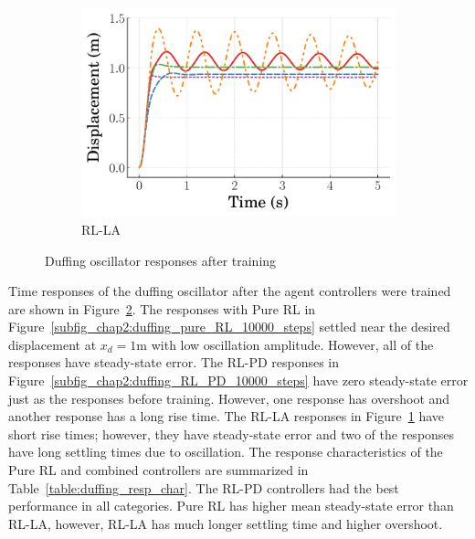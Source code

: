 \begin{figure}[tb]
    \hfill
    \begin{subfigure}[b]{0.49\textwidth}
        \centering
        \includegraphics[width=\textwidth]{figures/figures_RL_model_based_control/time_responses_duffing/duffing_RL_LA/Displacement_1_init_10000_steps.pdf}
        \caption{RL-LA}
        \label{subfig_chap2:duffing_RL_LA_10000_steps}
    \end{subfigure}
    \hfill
    \caption{Duffing oscillator responses after training}
    \label{fig_chap2:duffing_10000_steps}
\end{figure}
%
Time responses of the duffing oscillator after the agent controllers were trained are shown in Figure~\ref{fig_chap2:duffing_10000_steps}. The responses with Pure RL in Figure~\ref{subfig_chap2:duffing_pure_RL_10000_steps} settled near the desired displacement at $x_d=1\si{\meter}$ with low oscillation amplitude. However, all of the responses have steady-state error. The RL-PD responses in Figure~\ref{subfig_chap2:duffing_RL_PD_10000_steps} have zero steady-state error just as the responses before training. However, one response has overshoot and another response has a long rise time. The RL-LA responses in Figure~\ref{subfig_chap2:duffing_RL_LA_10000_steps} have short rise times; however, they have steady-state error and two of the responses have long settling times due to oscillation. The response characteristics of the Pure RL and combined controllers are summarized in Table~\ref{table:duffing_resp_char}. The RL-PD controllers had the best performance in all categories. Pure RL has higher mean steady-state error than RL-LA, however, RL-LA has much longer settling time and higher overshoot.
%
